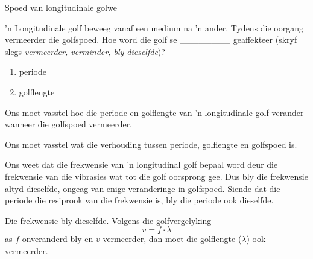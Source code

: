 \begin{wex}
{Spoed van longitudinale golwe}{ 'n Longitudinale golf beweeg vanaf een medium na 'n ander. Tydens die oorgang vermeerder die golfspoed. Hoe word die golf se ________ geaffekteer (skryf slegs \emph{vermeerder, verminder, bly dieselfde})?
\begin{enumerate}[noitemsep, label=\textbf{\arabic*}. ]\item periode
\item golflengte
\end{enumerate}
}{
Ons moet vasstel hoe die periode en golflengte van 'n longitudinale golf verander wanneer die golfspoed vermeerder.

Ons moet vasstel wat die verhouding tussen periode, golflengte en golfspoed is.

Ons weet dat die frekwensie van 'n longitudinal golf bepaal word deur die frekwensie van die vibrasies wat tot die golf oorsprong gee. Dus bly die frekwensie altyd dieselfde, ongeag van enige veranderinge in golfspoed. Siende dat die periode die resiprook van die frekwensie is, bly die periode ook dieselfde.

Die frekwensie bly dieselfde. Volgens die golfvergelyking
\begin{equation*}
v = f\cdot\lambda
\end{equation*}
as $f$ onveranderd bly en $v$ vermeerder, dan moet die golflengte ($\lambda$) ook vermeerder.
}
\end{wex}

    \noindent
  \label{m38782**end}
                   \label{m38783*cid8}


